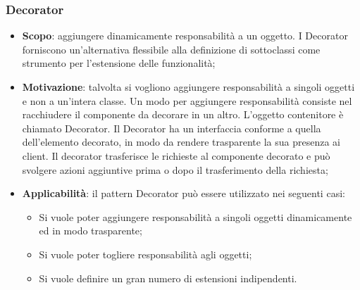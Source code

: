 		\subsubsection{Decorator}
	\begin{itemize}
	\item \textbf{Scopo}: aggiungere dinamicamente responsabilità a un oggetto. I Decorator forniscono
un’alternativa flessibile alla definizione di sottoclassi come strumento per l’estensione delle funzionalità;
	\item \textbf{Motivazione}: talvolta si vogliono aggiungere responsabilità a singoli oggetti e
non a un’intera classe. Un modo per aggiungere responsabilità consiste nel racchiudere il componente da
decorare in un altro. L’oggetto contenitore è chiamato Decorator. Il Decorator ha un interfaccia conforme a quella dell’elemento decorato, in modo da rendere trasparente la sua presenza ai client. Il decorator trasferisce le richieste al componente decorato e può svolgere azioni aggiuntive prima o dopo il trasferimento della richiesta;
	\item \textbf{Applicabilità}: il pattern Decorator può essere utilizzato nei seguenti casi:
	\begin{itemize}
	\item Si vuole poter aggiungere responsabilità a singoli oggetti dinamicamente ed in modo trasparente;
	\item Si vuole poter togliere responsabilità agli oggetti;
	\item Si vuole definire un gran numero di estensioni indipendenti.
	\end{itemize}
\end{itemize}			
		
